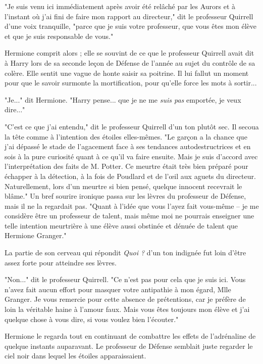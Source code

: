 "Je suis venu ici immédiatement après avoir été relâché par les Aurors et à l'instant où j'ai fini de faire mon rapport au directeur," dit le professeur Quirrell d'une voix tranquille, "parce que je suis votre professeur, que vous êtes mon élève et que je suis responsable de vous."

Hermione comprit alors ; elle se souvint de ce que le professeur Quirrell avait dit à Harry lors de sa seconde leçon de Défense de l'année au sujet du contrôle de sa colère. Elle sentit une vague de honte saisir sa poitrine. Il lui fallut un moment pour que le savoir surmonte la mortification, pour qu'elle force les mots à sortir...

"Je..." dit Hermione. "Harry pense... que je ne me \emph{suis pas } emportée, je veux dire..."

"C'est ce que j'ai entendu," dit le professeur Quirrell d'un ton plutôt sec. Il secoua la tête comme à l'intention des étoiles elles-mêmes. "Le garçon a la chance que j'ai dépassé le stade de l'agacement face à ses tendances autodestructrices et en sois à la pure curiosité quant à ce qu'il va faire ensuite. Mais je suis d'accord avec l'interprétation des faits de M. Potter. Ce meurtre était très bien préparé pour échapper à la détection, à la fois de Poudlard et de l'œil aux aguets du directeur. Naturellement, lors d'un meurtre si bien pensé, quelque innocent recevrait le blâme." Un bref sourire ironique passa sur les lèvres du professeur de Défense, mais il ne la regardait pas. "Quant à l'idée que vous l'ayez fait vous-même – je me considère être un professeur de talent, mais même moi ne pourrais enseigner une telle intention meurtrière à une élève aussi obstinée et dénuée de talent que Hermione Granger."

La partie de son cerveau qui répondit \emph{Quoi ?}  d'un ton indignée fut loin d'être assez forte pour atteindre ses lèvres.

"Non..." dit le professeur Quirrell. "Ce n'est pas pour cela que je suis ici. Vous n'avez fait aucun effort pour masquer votre antipathie à mon égard, Mlle Granger. Je vous remercie pour cette absence de prétentions, car je préfère de loin la véritable haine à l'amour faux. Mais vous êtes toujours mon élève et j'ai quelque chose à vous dire, si vous voulez bien l'écouter."

Hermione le regarda tout en continuant de combattre les effets de l'adrénaline de quelque instants auparavant. Le professeur de Défense semblait juste regarder le ciel noir dans lequel les étoiles apparaissaient.

